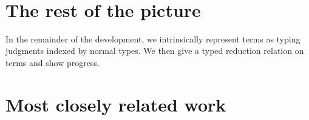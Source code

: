 \documentclass[authoryear, acmsmall, screen, review, nonacm]{acmart}
\begin{document}
\begin{code}
\>[0]\AgdaSpace{}%
\AgdaSymbol{\{}\AgdaSpace{}%
\AgdaSymbol{=}\AgdaSpace{}%
\AgdaSymbol{\}}\AgdaSpace{}%
\AgdaSymbol{\{}\AgdaSymbol{\}}\AgdaSpace{}%
\AgdaSpace{}%
\AgdaSymbol{=}\AgdaSpace{}%
\AgdaSpace{}%
\AgdaSymbol{(}\AgdaSpace{}%
\AgdaSymbol{)}\<%
\\
%
\\[\AgdaEmptyExtraSkip]%
\>[0]\AgdaComment{--------------------------------------------------------------------------------}\<%
\\
\>[0]\<%
\\
%
\\[\AgdaEmptyExtraSkip]%
\>[0]\AgdaSpace{}%
\AgdaSymbol{:}\AgdaSpace{}%
\AgdaSpace{}%
\AgdaSymbol{\{}\AgdaSpace{}%
\AgdaSymbol{\}}\AgdaSpace{}%
\AgdaSpace{}%
\AgdaSymbol{(}\AgdaSpace{}%
\AgdaSpace{}%
\AgdaSymbol{:}\AgdaSpace{}%
\AgdaSpace{}%
\AgdaSpace{}%
\AgdaSymbol{)}\AgdaSpace{}%
\AgdaSpace{}%
\AgdaSpace{}%
\AgdaSpace{}%
\AgdaSpace{}%
\AgdaSpace{}%
\AgdaSpace{}%
\AgdaSpace{}%
\AgdaSpace{}%
\AgdaSpace{}%
\<%
\\
\>[0]\AgdaSpace{}%
\AgdaSpace{}%
\AgdaSpace{}%
\AgdaSpace{}%
\AgdaSymbol{=}\AgdaSpace{}%
\AgdaSpace{}%
\AgdaSymbol{(}\AgdaSpace{}%
\AgdaSymbol{)}\AgdaSpace{}%
\AgdaSymbol{(}\AgdaSpace{}%
\AgdaSymbol{)}\<%
\end{code}

\section{The rest of the picture}

In the remainder of the development, we intrinsically represent terms as typing judgments indexed by normal types. We then give a typed reduction relation on terms and show progress.

\section{Most closely related work}
\subsubsection{\citet{ChapmanKNW19}}
\subsubsection{\citet{AllaisBM13}}




\end{document}
